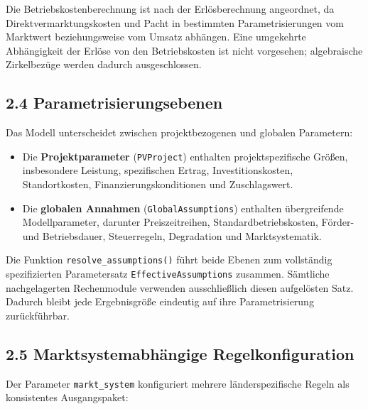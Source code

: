 \documentclass[
  a4paper,
  10pt]{article}
\providecommand{\tightlist}{%
  \setlength{\itemsep}{0pt}\setlength{\parskip}{0pt}}
\begin{document}
Die Betriebskostenberechnung ist nach der Erlösberechnung angeordnet, da
Direktvermarktungskosten und Pacht in bestimmten Parametrisierungen vom
Marktwert beziehungsweise vom Umsatz abhängen. Eine umgekehrte
Abhängigkeit der Erlöse von den Betriebskosten ist nicht vorgesehen;
algebraische Zirkelbezüge werden dadurch ausgeschlossen.

\hypertarget{parametrisierungsebenen}{%
\subsection{2.4 Parametrisierungsebenen}\label{parametrisierungsebenen}}

Das Modell unterscheidet zwischen projektbezogenen und globalen
Parametern:

\begin{itemize}
\tightlist
\item
  Die \textbf{Projektparameter} (\texttt{PVProject}) enthalten
  projektspezifische Größen, insbesondere Leistung, spezifischen Ertrag,
  Investitionskosten, Standortkosten, Finanzierungskonditionen und
  Zuschlagswert.
\item
  Die \textbf{globalen Annahmen} (\texttt{GlobalAssumptions}) enthalten
  übergreifende Modellparameter, darunter Preiszeitreihen,
  Standardbetriebskosten, Förder- und Betriebsdauer, Steuerregeln,
  Degradation und Marktsystematik.
\end{itemize}

Die Funktion \texttt{resolve\_assumptions()} führt beide Ebenen zum
vollständig spezifizierten Parametersatz \texttt{EffectiveAssumptions}
zusammen. Sämtliche nachgelagerten Rechenmodule verwenden ausschließlich
diesen aufgelösten Satz. Dadurch bleibt jede Ergebnisgröße eindeutig auf
ihre Parametrisierung zurückführbar.

\hypertarget{marktsystemabhuxe4ngige-regelkonfiguration}{%
\subsection{2.5 Marktsystemabhängige
Regelkonfiguration}\label{marktsystemabhuxe4ngige-regelkonfiguration}}

Der Parameter \texttt{markt\_system} konfiguriert mehrere
länderspezifische Regeln als konsistentes Ausgangspaket:
\end{document}
